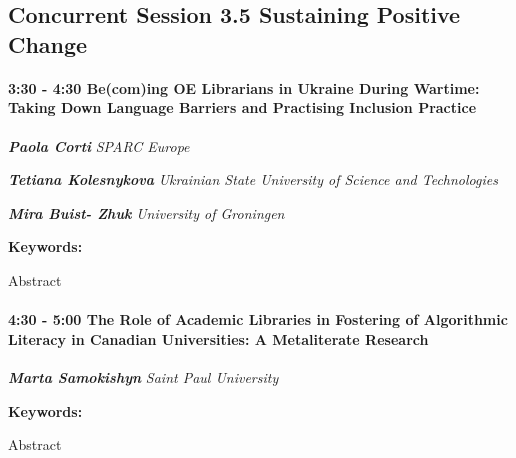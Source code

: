 \documentclass[
]{book}
\begin{document}
\hypertarget{concurrent-session-3.5-sustaining-positive-change}{%
\subsection*{Concurrent Session 3.5 \textbar{} Sustaining Positive Change}\label{concurrent-session-3.5-sustaining-positive-change}}

\begin{session}
\hypertarget{becoming-oe-librarians-in-ukraine-during-wartime-taking-down-language-barriers-and-practising-inclusion-practice}{%
\paragraph*{\texorpdfstring{3:30 - 4:30 \textbar{} \textbf{Be(com)ing OE
Librarians in Ukraine During Wartime: Taking Down Language Barriers and
Practising Inclusion} \textbar{}
Practice}{3:30 - 4:30 \textbar{} Be(com)ing OE Librarians in Ukraine During Wartime: Taking Down Language Barriers and Practising Inclusion \textbar{} Practice}}\label{becoming-oe-librarians-in-ukraine-during-wartime-taking-down-language-barriers-and-practising-inclusion-practice}}

\textbf{\emph{Paola Corti}} \textbar{} \emph{SPARC Europe}

\textbf{\emph{Tetiana Kolesnykova}} \textbar{} \emph{Ukrainian State
University of Science and Technologies}

\textbf{\emph{Mira Buist- Zhuk}} \textbar{} \emph{University of
Groningen}

\textbf{Keywords:}

Abstract
\end{session}

\begin{session}
\hypertarget{the-role-of-academic-libraries-in-fostering-of-algorithmic-literacy-in-canadian-universities-a-metaliterate-research}{%
\paragraph*{\texorpdfstring{4:30 - 5:00 \textbar{} \textbf{The Role of
Academic Libraries in Fostering of Algorithmic Literacy in Canadian
Universities: A Metaliterate} \textbar{}
Research}{4:30 - 5:00 \textbar{} The Role of Academic Libraries in Fostering of Algorithmic Literacy in Canadian Universities: A Metaliterate \textbar{} Research}}\label{the-role-of-academic-libraries-in-fostering-of-algorithmic-literacy-in-canadian-universities-a-metaliterate-research}}

\textbf{\emph{Marta Samokishyn}} \textbar{} \emph{Saint Paul University}

\textbf{Keywords:}

Abstract
\end{session}
\end{document}
